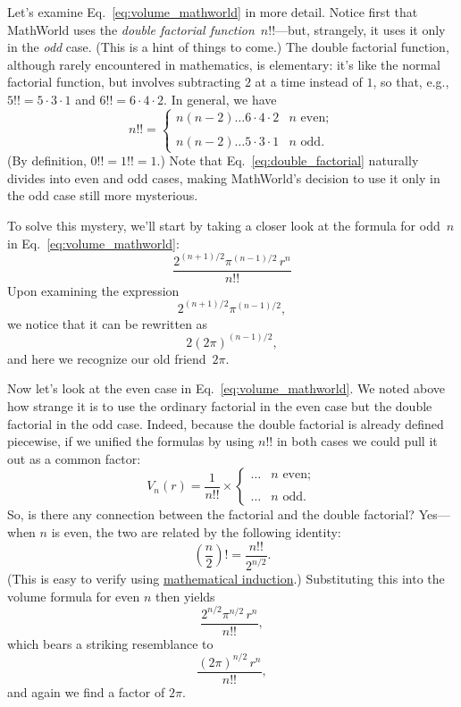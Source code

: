 {Let's examine Eq.~\eqref{eq:volume_mathworld} in more detail. Notice first that MathWorld uses the \emph{double factorial function}~$n!!$---but, strangely, it uses it only in the \emph{odd} case. (This is a hint of things to come.) The double factorial function, although rarely encountered in mathematics, is elementary: it's like the normal factorial function, but involves subtracting $2$ at a time instead of $1$, so that, e.g., $5!! = 5 \cdot 3 \cdot 1$ and $6!! = 6 \cdot 4 \cdot 2$. In general, we have
\begin{equation}
\label{eq:double_factorial}
n!! = \begin{cases}
n(n-2)\ldots6\cdot4\cdot2 & n \text{ even}; \\ \\
n(n-2)\ldots5\cdot3\cdot1 & n \text{ odd}.
\end{cases}
\end{equation}
(By definition, $0!! = 1!! = 1$.) Note that Eq.~\eqref{eq:double_factorial} naturally divides into even and odd cases, making MathWorld's decision to use it only in the odd case still more mysterious.

To solve this mystery, we'll start by taking a closer look at the formula for odd~$n$ in Eq.~\eqref{eq:volume_mathworld}:
\[ \frac{2^{(n+1)/2}\pi^{(n-1)/2}\,r^n}{n!!} \]
Upon examining the expression
\[ 2^{(n+1)/2}\pi^{(n-1)/2}, \]
we notice that it can be rewritten as
\[ 2(2\pi)^{(n-1)/2}, \]
and here we recognize our old friend~$2\pi$.

Now let's look at the even case in Eq.~\eqref{eq:volume_mathworld}. We noted above how strange it is to use the ordinary factorial in the even case but the double factorial in the odd case. Indeed, because the double factorial is already defined piecewise, if we unified the formulas by using $n!!$ in both cases we could pull it out as a common factor:
\[
V_n(r) = \frac{1}{n!!}\times \begin{cases}
\ldots & n \text{ even}; \\ \\
 \ldots & n \text{ odd}.
 \end{cases}
\]
So, is there any connection between the factorial and the double factorial? Yes---when $n$ is even, the two are related by the following identity:
\[ \left(\frac{n}{2}\right)! = \frac{n!!}{2^{n/2}}. \]
(This is easy to verify using \href{https://en.wikipedia.org/wiki/Mathematical_induction}{mathematical induction}.) Substituting this into the volume formula for even $n$ then yields
\[ \frac{2^{n/2}\pi^{n/2}\,r^n}{n!!}, \]
which bears a striking resemblance to
\[ \frac{(2\pi)^{n/2}\,r^n}{n!!}, \]
and again we find a factor of $2\pi$.

}
